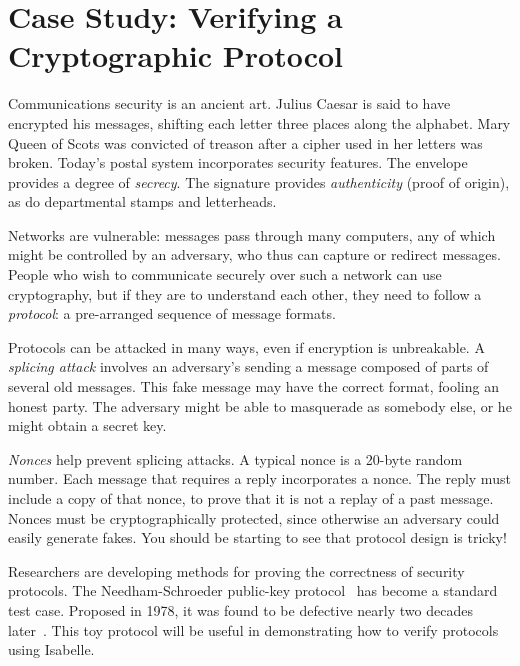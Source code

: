 \chapter{Case Study: Verifying a Cryptographic Protocol}
\label{chap:crypto}

\def\lbb{\mathopen{\{\kern-.30em|}}
\def\rbb{\mathclose{|\kern-.32em\}}}
\def\comp#1{\lbb#1\rbb}

Communications security is an ancient art.  Julius Caesar is said to have
encrypted his messages, shifting each letter three places along the
alphabet.  Mary Queen of Scots was convicted of treason after a cipher used
in her letters was broken.  Today's postal system incorporates security
features. The envelope provides a degree of
\emph{secrecy}.  The signature provides \emph{authenticity} (proof of
origin), as do departmental stamps and letterheads. 

Networks are vulnerable: messages pass through many computers, any of which
might be controlled by an adversary, who thus can capture or redirect
messages.  People who wish to communicate securely over such a network can
use cryptography, but if they are to understand each other, they need to
follow a
\emph{protocol}: a pre-arranged sequence of message formats. 

Protocols can be attacked in many ways, even if encryption is unbreakable. 
A \emph{splicing attack} involves an adversary's sending a message composed
of parts of several old messages.  This fake message may have the correct
format, fooling an honest party.  The adversary might be able to masquerade
as somebody else, or he might obtain a secret key.

\emph{Nonces} help prevent splicing attacks. A typical nonce is a 20-byte
random number. Each message that requires a reply incorporates a nonce. The
reply must include a copy of that nonce, to prove that it is not a replay of
a past message.  Nonces must be cryptographically protected, since
otherwise an adversary could easily generate fakes. You should be starting
to see that protocol design is tricky!

Researchers are developing methods for proving the correctness of security
protocols.  The Needham-Schroeder public-key
protocol~\cite{needham-schroeder} has become a standard test case. 
Proposed in 1978, it was found to be defective nearly two decades
later~\cite{lowe-fdr}.  This toy protocol will be useful in demonstrating
how to verify protocols using Isabelle.


